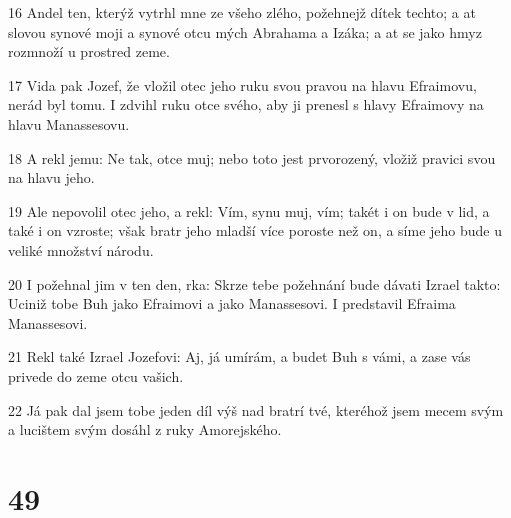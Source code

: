 \par 16 Andel ten, kterýž vytrhl mne ze všeho zlého, požehnejž dítek techto; a at slovou synové moji a synové otcu mých Abrahama a Izáka; a at se jako hmyz rozmnoží u prostred zeme.
\par 17 Vida pak Jozef, že vložil otec jeho ruku svou pravou na hlavu Efraimovu, nerád byl tomu. I zdvihl ruku otce svého, aby ji prenesl s hlavy Efraimovy na hlavu Manassesovu.
\par 18 A rekl jemu: Ne tak, otce muj; nebo toto jest prvorozený, vložiž pravici svou na hlavu jeho.
\par 19 Ale nepovolil otec jeho, a rekl: Vím, synu muj, vím; takét i on bude v lid, a také i on vzroste; však bratr jeho mladší více poroste než on, a síme jeho bude u veliké množství národu.
\par 20 I požehnal jim v ten den, rka: Skrze tebe požehnání bude dávati Izrael takto: Uciniž tobe Buh jako Efraimovi a jako Manassesovi. I predstavil Efraima Manassesovi.
\par 21 Rekl také Izrael Jozefovi: Aj, já umírám, a budet Buh s vámi, a zase vás privede do zeme otcu vašich.
\par 22 Já pak dal jsem tobe jeden díl výš nad bratrí tvé, kteréhož jsem mecem svým a lucištem svým dosáhl z ruky Amorejského.

\chapter{49}

